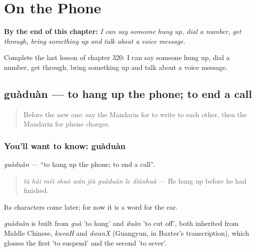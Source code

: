 
\chapter{On the Phone}
\label{ch:zh-on-the-phone}

\begin{chapteropening}
\textbf{By the end of this chapter:} \emph{I can say someone hung up, dial a number, get through, bring something up and talk about a voice message.}

Complete the last lesson of chapter 320: I can say someone hung up, dial a number, get through, bring something up and talk about a voice message.
\end{chapteropening}

\section[guàduàn]{guàduàn — to hang up the phone; to end a call}

\label{lesson:ZH-C320-guaduan}



\begin{quote}
Before the new one: say the Mandarin for to write to each other, then the Mandarin for phone charges.
\end{quote}

\subsection*{You'll want to know: guàduàn}
\emph{guàduàn} — \textquotedblleft{}to hang up the phone; to end a call\textquotedblright{}.

\begin{quote}
\emph{tā hái méi shuō wán jiù guàduàn le diànhuà} — He hung up before he had finished.
\end{quote}

Its characters come later; for now it is a word for the ear.

\begin{cousinweb}
\emph{guàduàn} is built from \emph{guà} 'to hang' and \emph{duàn} 'to cut off', both inherited from Middle Chinese, \emph{kweaH} and \emph{dwanX} (Guangyun, in Baxter's transcription), which glosses the first 'to suspend' and the second 'to sever'.
\end{cousinweb}

